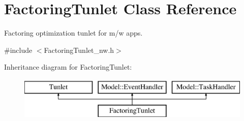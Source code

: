 \hypertarget{class_factoring_tunlet}{\section{Factoring\-Tunlet Class Reference}
\label{class_factoring_tunlet}
}


Factoring optimization tunlet for m/w apps.  




{\ttfamily \#include $<$Factoring\-Tunlet\-\_\-nw.\-h$>$}

Inheritance diagram for Factoring\-Tunlet\-:\begin{figure}[H]
\begin{center}
\leavevmode
\includegraphics[height=2.000000cm]{class_factoring_tunlet}
\end{center}
\end{figure}
